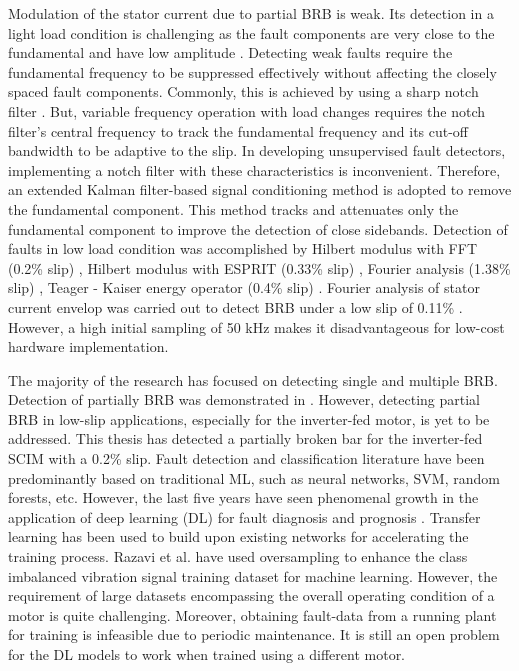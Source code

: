 Modulation of the stator current due to partial BRB is weak. Its detection in a light load condition is challenging as the fault components are very close to the fundamental \cite{Xu2010} and have low amplitude \cite{Concari2008}. Detecting weak faults require the fundamental frequency to be suppressed effectively without affecting the closely spaced fault components. Commonly, this is achieved by using a sharp notch filter \cite{ayhan2008}. But, variable frequency operation with load changes requires the notch filter's central frequency to track the fundamental frequency and its cut-off bandwidth to be adaptive to the slip. In developing unsupervised fault detectors, implementing a notch filter with these characteristics is inconvenient. Therefore, an extended Kalman filter-based signal conditioning method is adopted to remove the fundamental component. This method tracks and attenuates only the fundamental component to improve the detection of close sidebands. Detection of faults in low load condition was accomplished by Hilbert modulus with FFT (0.2\% slip) \cite{Puche-Panadero2009}, Hilbert modulus with ESPRIT (0.33\% slip) \cite{Xu2013}, Fourier analysis (1.38\% slip) \cite{dias2014}, Teager - Kaiser energy operator (0.4\% slip) \cite{pineda2013}. Fourier analysis of stator current envelop was carried out to detect BRB under a low slip of 0.11\% \cite{Sapena-Bano2016_low}. However, a high initial sampling of 50 kHz makes it disadvantageous for low-cost hardware implementation. 

The majority of the research has focused on detecting single and multiple BRB. Detection of partially BRB was demonstrated in \cite{Climente2015, didier2006, kia2005}. However, detecting partial BRB in low-slip applications, especially for the inverter-fed motor, is yet to be addressed. This thesis has detected a partially broken bar for the inverter-fed SCIM with a 0.2\% slip. Fault detection and classification literature have been predominantly based on traditional ML, such as neural networks, SVM, random forests, etc. However, the last five years have seen phenomenal growth in the application of deep learning (DL) for fault diagnosis and prognosis \cite{ han2019adaptive, zhao2019deep, lei2020applications}. Transfer learning \cite{shao2018highly} has been used to build upon existing networks for accelerating the training process. Razavi et al. \cite{razavi2017integrated} have used oversampling to enhance the class imbalanced vibration signal training dataset for machine learning. However, the requirement of large datasets encompassing the overall operating condition of a motor is quite challenging. Moreover, obtaining fault-data from a running plant for training is infeasible due to periodic maintenance. It is still an open problem for the DL models to work when trained using a different motor.

